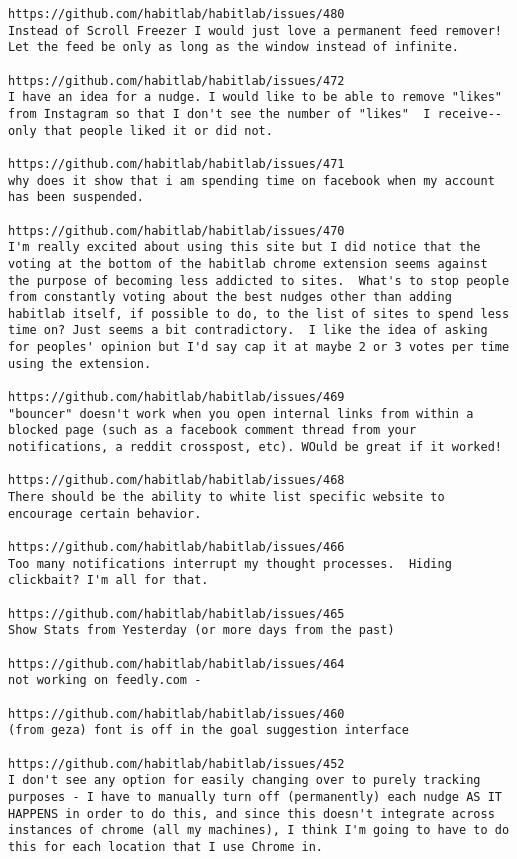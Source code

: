\begin{lstlisting}[breaklines]
https://github.com/habitlab/habitlab/issues/480
Instead of Scroll Freezer I would just love a permanent feed remover! Let the feed be only as long as the window instead of infinite.

https://github.com/habitlab/habitlab/issues/472
I have an idea for a nudge. I would like to be able to remove "likes" from Instagram so that I don't see the number of "likes"  I receive--only that people liked it or did not.

https://github.com/habitlab/habitlab/issues/471
why does it show that i am spending time on facebook when my account has been suspended.

https://github.com/habitlab/habitlab/issues/470
I'm really excited about using this site but I did notice that the voting at the bottom of the habitlab chrome extension seems against the purpose of becoming less addicted to sites.  What's to stop people from constantly voting about the best nudges other than adding habitlab itself, if possible to do, to the list of sites to spend less time on? Just seems a bit contradictory.  I like the idea of asking for peoples' opinion but I'd say cap it at maybe 2 or 3 votes per time using the extension.

https://github.com/habitlab/habitlab/issues/469
"bouncer" doesn't work when you open internal links from within a blocked page (such as a facebook comment thread from your notifications, a reddit crosspost, etc). WOuld be great if it worked!

https://github.com/habitlab/habitlab/issues/468
There should be the ability to white list specific website to encourage certain behavior.

https://github.com/habitlab/habitlab/issues/466
Too many notifications interrupt my thought processes.  Hiding clickbait? I'm all for that.

https://github.com/habitlab/habitlab/issues/465
Show Stats from Yesterday (or more days from the past)

https://github.com/habitlab/habitlab/issues/464
not working on feedly.com -

https://github.com/habitlab/habitlab/issues/460
(from geza) font is off in the goal suggestion interface

https://github.com/habitlab/habitlab/issues/452
I don't see any option for easily changing over to purely tracking purposes - I have to manually turn off (permanently) each nudge AS IT  HAPPENS in order to do this, and since this doesn't integrate across instances of chrome (all my machines), I think I'm going to have to do this for each location that I use Chrome in.


\end{lstlisting}
